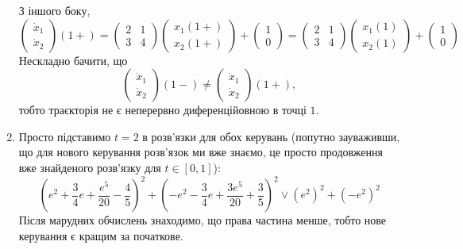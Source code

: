 \begin{solution}
\begin{enumerate}
		З іншого боку,
		\[
			\begin{pmatrix}
				\dot x_1 \\
				\dot x_2
			\end{pmatrix}
			(1+) 
			= 
			\begin{pmatrix}
				2 & 1 \\
				3 & 4
			\end{pmatrix}
			\begin{pmatrix}
				x_1(1+) \\
				x_2(1+)
			\end{pmatrix}
			+
			\begin{pmatrix}
				1 \\
				0
			\end{pmatrix}
			= 
			\begin{pmatrix}
				2 & 1 \\
				3 & 4
			\end{pmatrix}
			\begin{pmatrix}
				x_1(1) \\
				x_2(1)
			\end{pmatrix}
			+
			\begin{pmatrix}
				1 \\
				0
			\end{pmatrix}
		\]
		Нескладно бачити, що 
		\[
			\begin{pmatrix}
				\dot x_1 \\
				\dot x_2
			\end{pmatrix}
			(1-)
			\ne
			\begin{pmatrix}
				\dot x_1 \\
				\dot x_2
			\end{pmatrix}
			(1+),
		\]
		тобто траєкторія не є неперервно диференційовною в точці $1$.
		\item 
		Просто підставимо $t=2$ в розв'язки для обох керувань (попутно зауваживши, що для нового керування розв'язок ми вже знаємо, це просто продовження вже знайденого розв'язку для $t \in [0, 1]$):
		\[
			\left(e^2 + \dfrac34e + \dfrac{e^5}{20} - \dfrac45\right)^2 + \left(-e^2 - \dfrac34e + \dfrac{3e^5}{20} + \dfrac35\right)^2
			\lor
			(e^2)^2 + (-e^2)^2
		\]
		Після марудних обчислень знаходимо, що права частина менше, тобто нове керування є кращим за початкове.
	\end{enumerate}
\end{solution}
